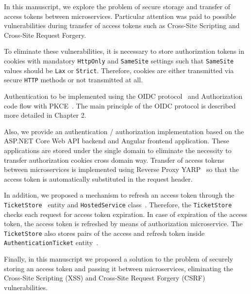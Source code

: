 In this manuscript, we explore the problem of secure storage and transfer of access tokens between microservices.
Particular attention was paid to possible vulnerabilities during transfer of access tokens such
as Cross-Site Scripting and Cross-Site Request Forgery.

To eliminate these vulnerabilities, it is necessary to store authorization tokens in cookies with mandatory
\texttt{HttpOnly} and \texttt{SameSite} settings such that \texttt{SameSite} values should be \texttt{Lax} or \texttt{Strict}.
Therefore, cookies are either transmitted via secure \texttt{HTTP} methods or not transmitted at all.

Authentication to be implemented using the OIDC protocol~\cite{siriwardenaOpenid2020, sakimuraOpenid2014}
and Authorization code flow with PKCE~\cite{bradley2015rfc}.
The main principle of the OIDC protocol is described more detailed in Chapter 2.

Also, we provide an authentication / authorization implementation based on the ASP.NET Core Web API backend and Angular
frontend application.
These applications are stored under the single domain to eliminate the necessity to transfer authorization cookies cross domain way.
Transfer of access tokens between microservices is implemented using Reverse Proxy YARP~\cite{microsoftYarp2021} so that
the access token is automatically substituted in the request header.

In addition, we proposed a mechanism to refresh an access token through the
\texttt{TicketStore}~\cite{microsoftIticketstore2023} entity
and \texttt{HostedService} class~\cite{microsoftHostedservice2023}.
Therefore, the \texttt{TicketStore} checks each request for access token expiration.
In case of expiration of the access token, the access token is refreshed by means of authorization microservice.
The \texttt{TicketStore} also stores pairs of the access and refresh token inside
\texttt{AuthenticationTicket} entity~\cite{microsoftAuthenticationTicket2023}.

Finally, in this manuscript we proposed a solution to the problem of securely storing an access token and passing it between microservices,
eliminating the Cross-Site Scripting (XSS) and Cross-Site Request Forgery (CSRF) vulnerabilities.